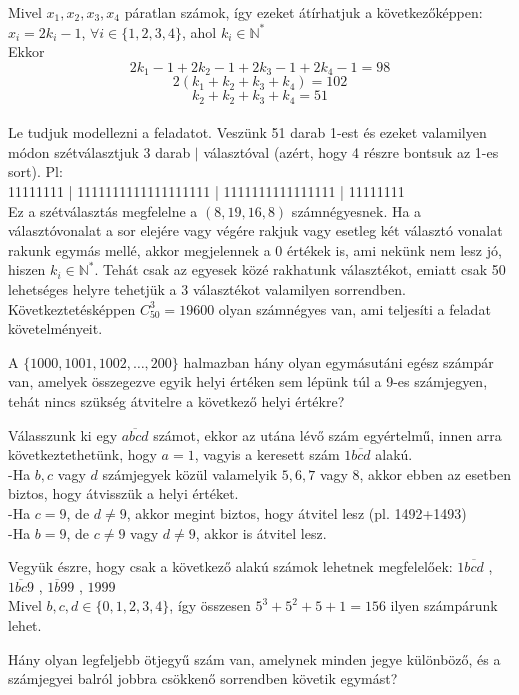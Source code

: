 \begin{solution}
Mivel $x_{1},x_{2},x_{3},x_{4}$ páratlan számok, így ezeket átírhatjuk
a következőképpen: $x_{i}=2k_{i}-1$, $\forall i\in\{1,2,3,4\}$,
ahol $k_{i}\in\mathbb{N}^{*}$ \\
 Ekkor 
\[
2k_{1}-1+2k_{2}-1+2k_{3}-1+2k_{4}-1=98
\]
\[
2(k_{1}+k_{2}+k_{3}+k_{4})=102
\]
\[
k_{2}+k_{2}+k_{3}+k_{4}=51
\]
\\
Le tudjuk modellezni a feladatot. Veszünk 51 darab 1-est és ezeket
valamilyen módon szétválasztjuk 3 darab $|$ választóval (azért, hogy
4 részre bontsuk az 1-es sort). Pl: \\
 11111111 | 1111111111111111111 | 1111111111111111 | 11111111 \\
 Ez a szétválasztás megfelelne a $(8,19,16,8)$ számnégyesnek. Ha
a választóvonalat a sor elejére vagy végére rakjuk vagy esetleg két
választó vonalat rakunk egymás mellé, akkor megjelennek a $0$ értékek
is, ami nekünk nem lesz jó, hiszen $k_{i}\in\mathbb{N}^{*}$. Tehát
csak az egyesek közé rakhatunk választékot, emiatt csak 50 lehetséges
helyre tehetjük a 3 választékot valamilyen sorrendben. Következtetésképpen
${\displaystyle {C_{50}^{3}}=19600}$ olyan számnégyes van, ami teljesíti
a feladat követelményeit. 
\end{solution}
\begin{extraproblem}
A $\{1000,1001,1002,\ldots,200\}$ halmazban hány olyan egymásutáni
egész számpár van, amelyek összegezve egyik helyi értéken sem lépünk
túl a 9-es számjegyen, tehát nincs szükség átvitelre a következő helyi
értékre?
\end{extraproblem}

\begin{solution}
Válasszunk ki egy $\overline{abcd}$ számot, ekkor az utána lévő szám
egyértelmű, innen arra következtethetünk, hogy $a=1$, vagyis a keresett
szám $1\overline{bcd}$ alakú. \\
-Ha $b,c$ vagy $d$ számjegyek közül valamelyik $5,6,7$ vagy $8$,
akkor ebben az esetben biztos, hogy átvisszük a helyi értéket. \\
-Ha $c=9$, de $d\neq9$, akkor megint biztos, hogy átvitel lesz (pl.
1492+1493) \\
-Ha $b=9$, de $c\neq9$ vagy $d\neq9$, akkor is átvitel lesz.

Vegyük észre, hogy csak a következő alakú számok lehetnek megfelelőek:
$1\overline{bcd}$ , $1\overline{bc}9$ , $1\overline{b}99$ , $1999$
\\
Mivel $b,c,d\in\{0,1,2,3,4\}$, így összesen $5^{3}+5^{2}+5+1=156$
ilyen számpárunk lehet.
\end{solution}
\begin{extraproblem}
 Hány olyan legfeljebb ötjegyű szám van, amelynek minden jegye különböző,
és a számjegyei balról jobbra csökkenő sorrendben követik egymást? 
\end{extraproblem}

